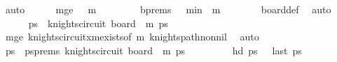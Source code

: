 \begin{isabellebody}
\ auto\isanewline
\ \ \ \ \isamarkupfalse%
\ m{\isacharunderscore}{\kern0pt}ge{\isacharcolon}{\kern0pt}\ {\isachardoublequoteopen}{}\ {\isasymle}\ m{\isacharminus}{\kern0pt}{}{\isachardoublequoteclose}\ \isanewline
\ \ \ \ \isamarkupfalse%
\ \isamarkupfalse%
\ b{\isacharunderscore}{\kern0pt}prems{\isacharcolon}{\kern0pt}\ {\isachardoublequoteopen}{}\ {\isasymle}\ min\ {}\ {\isacharparenleft}{\kern0pt}m{\isacharminus}{\kern0pt}{}{\isacharparenright}{\kern0pt}{\isachardoublequoteclose}\isanewline
\ \ \ \ \ \ \isamarkupfalse%
\ board{\isacharunderscore}{\kern0pt}def\ \isamarkupfalse%
\ auto\isanewline
\isanewline
\ \ \ \ \isamarkupfalse%
\ ps\ \ {\isachardoublequoteopen}knights{\isacharunderscore}{\kern0pt}circuit\ {\isacharparenleft}{\kern0pt}board\ {}\ {\isacharparenleft}{\kern0pt}m{\isacharminus}{\kern0pt}{}{\isacharparenright}{\kern0pt}{\isacharparenright}{\kern0pt}\ ps\isanewline
\ \ \ \ \ \ \isamarkupfalse%
\ m{\isacharunderscore}{\kern0pt}ge\ knights{\isacharunderscore}{\kern0pt}circuit{\isacharunderscore}{\kern0pt}{}xm{\isacharunderscore}{\kern0pt}exists{\isacharbrackleft}{\kern0pt}of\ {\isachardoublequoteopen}{\isacharparenleft}{\kern0pt}m{\isacharminus}{\kern0pt}{}{\isacharparenright}{\kern0pt}{\isachardoublequoteclose}{\isacharbrackright}{\kern0pt}\ knights{\isacharunderscore}{\kern0pt}path{\isacharunderscore}{\kern0pt}non{\isacharunderscore}{\kern0pt}nil\ \isamarkupfalse%
\ auto\isanewline
\ \ \ \ \isamarkupfalse%
\ \isamarkupfalse%
\ ps\ \ psprems{\isacharprime}{\kern0pt}{\isacharcolon}{\kern0pt}\ {\isachardoublequoteopen}knights{\isacharunderscore}{\kern0pt}circuit\ {\isacharparenleft}{\kern0pt}board\ {}\ {\isacharparenleft}{\kern0pt}m{\isacharminus}{\kern0pt}{}{\isacharparenright}{\kern0pt}{\isacharparenright}{\kern0pt}\ ps\ \isanewline
\ \ \ \ \ \ \ \ {\isachardoublequoteopen}hd\ ps\ {\isacharequal}{\kern0pt}\ {\isacharparenleft}{\kern0pt}{}{\isacharcomma}{\kern0pt}{}{\isacharparenright}{\kern0pt}{\isachardoublequoteclose}\ {\isachardoublequoteopen}last\ ps\ {\isacharequal}{\kern0pt}\ {\isacharparenleft}{\kern0pt}{}{\isacharcomma}{\kern0pt}{}{\isacharparenright}{\kern0pt}{\isachardoublequoteclose}\isanewline

\end{isabellebody}
